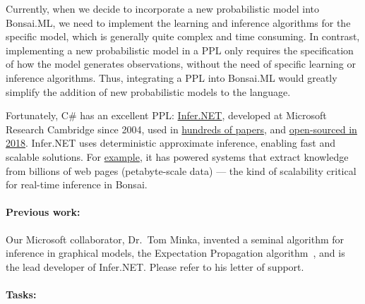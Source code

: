 Currently, when we decide to incorporate a new probabilistic model into
Bonsai.ML, we need to implement the learning and inference algorithms for the
specific model, which is generally quite complex and time consuming.
%
In contrast, implementing a new probabilistic model in a PPL only requires the
specification of how the model generates observations, without the
need of specific learning or inference algorithms.
%
Thus, integrating a PPL into Bonsai.ML would greatly simplify the addition of
new probabilistic models to the language.

Fortunately, C\# has an excellent PPL:
\href{https://dotnet.github.io/infer/}{Infer.NET}, developed at Microsoft
Research Cambridge since 2004, used in
\href{https://dotnet.github.io/infer/papers.html}{hundreds of papers}, and
\href{https://www.microsoft.com/en-us/research/blog/the-microsoft-infer-net-machine-learning-framework-goes-open-source/}{open-sourced
in 2018}.  Infer.NET uses deterministic approximate inference, enabling fast
and scalable solutions. For
\href{https://www.microsoft.com/en-us/research/blog/the-microsoft-infer-net-machine-learning-framework-goes-open-source/}{example},
it has powered systems that extract knowledge from billions of web pages
(petabyte-scale data) — the kind of scalability critical for real-time
inference in Bonsai.

\paragraph{Previous work:} Our Microsoft collaborator, Dr.~Tom Minka, invented
a seminal algorithm for inference in graphical models, the Expectation
Propagation algorithm~\citep{minka01}, and is the lead developer of Infer.NET.
Please refer to his letter of support.

\paragraph{Tasks:}\mbox{}\\

